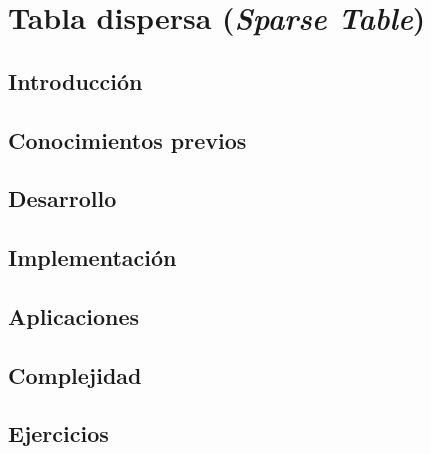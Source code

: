 \chapter{Tabla dispersa (\emph{Sparse Table})}
\section{Introducción}

\section{Conocimientos previos}

\section{Desarrollo}

\section{Implementación}

\section{Aplicaciones}

\section{Complejidad}

\section{Ejercicios}
